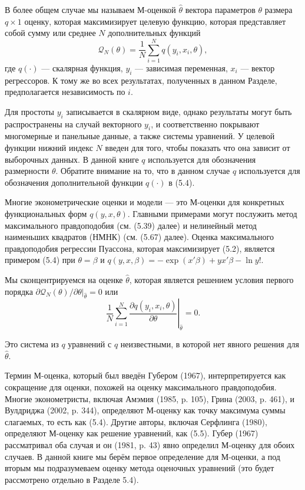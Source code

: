 В более общем случае мы называем М-оценкой $\hat{\theta}$ вектора параметров $\theta$ размера $q \times 1$ оценку, которая максимизирует целевую функцию, которая представляет собой сумму или среднее $N$ дополнительных функций
\begin{equation}
\mathcal{Q}_N(\theta)= \frac{1}{N} \sum_{i=1}^{N} q(y_i,x_i,\theta),
\end{equation}
где $q(\cdot)$ --- скалярная функция, $y_i$ --- зависимая переменная, $x_i$ --- вектор регрессоров. К тому же во всех результатах, полученных в данном Разделе, предполагается независимость по $i$.

Для простоты $y_i$ записывается в скалярном виде, однако результаты могут быть распространены на случай векторного $y_i$, и соответственно покрывают многомерные и панельные данные, а также системы уравнений. У целевой функции нижний индекс $N$ введен для того, чтобы показать что она зависит от выборочных данных. В данной книге $q$ используется для обозначения размерности $\theta$. Обратите внимание на то, что в данном случае $q$ используется для обозначения дополнительной функции $q(\cdot)$ в (5.4).

Многие эконометрические оценки и модели --- это М-оценки для конкретных функциональных форм $q(y,x,\theta)$. Главными примерами могут послужить метод максимального правдоподобия (см. (5.39) далее) и нелинейный метод наименьших квадратов (НМНК) (см. (5.67) далее). Оценка максимального правдоподобия регрессии Пуассона, которая максимизирует (5.2), является примером (5.4) при $\theta=\beta$ и $q(y,x,\beta)=-\exp(x'\beta)+y x' \beta - \ln y!$.

Мы сконцентрируемся на оценке $\hat{\theta}$, которая является решением условия первого порядка  
$ \partial \mathcal{Q}_N(\theta) / \partial \theta |_{\hat{\theta}} = 0$ или
\begin{equation}
\left. \frac{1}{N} \sum_{i=1}^{N} \frac{\partial q(y_i,x_i,\theta)}{\partial \theta} \right|_{\hat{\theta}}=0.
\end{equation}

Это система из $q$ уравнений с $q$ неизвестными, в которой нет явного решения для $\hat{\theta}$.

Термин М-оценка, который был введён Губером (1967), интерпретируется как сокращение для оценки, похожей на оценку максимального правдоподобия. Многие эконометристы, включая Амэмия (1985, p. 105), Грина (2003, p. 461), и Вулдриджа (2002, p. 344), определяют М-оценку как точку максимума суммы слагаемых, то есть как (5.4). Другие авторы, включая Серфлинга (1980), определяют М-оценку как решение уравнений, как (5.5). Губер (1967) рассматривал оба случая и он (1981, p. 43) явно определил М-оценку для обоих случаев. В данной книге мы берём первое определение для М-оценки, а под вторым мы подразумеваем оценку метода оценочных уравнений (это будет рассмотрено отдельно в Разделе 5.4).

